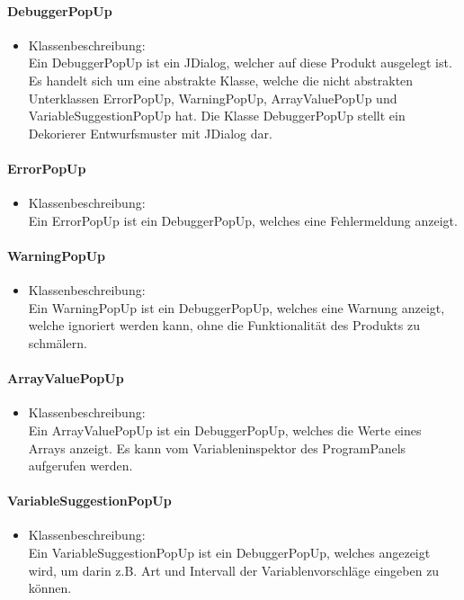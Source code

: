 \documentclass[parskip=full]{scrartcl}
\begin{document}
\paragraph{DebuggerPopUp}
\begin{itemize}
\item Klassenbeschreibung: \\
Ein DebuggerPopUp ist ein JDialog, welcher auf diese Produkt ausgelegt ist. Es handelt sich um eine abstrakte Klasse, welche die nicht abstrakten Unterklassen ErrorPopUp, WarningPopUp, ArrayValuePopUp und VariableSuggestionPopUp hat. Die Klasse DebuggerPopUp stellt ein Dekorierer Entwurfsmuster mit JDialog dar.
\end{itemize}

\paragraph{ErrorPopUp}
\begin{itemize}
\item Klassenbeschreibung: \\
Ein ErrorPopUp ist ein DebuggerPopUp, welches eine Fehlermeldung anzeigt.
\end{itemize}

\paragraph{WarningPopUp}
\begin{itemize}
\item Klassenbeschreibung: \\
Ein WarningPopUp ist ein DebuggerPopUp, welches eine Warnung anzeigt, welche ignoriert werden kann, ohne die Funktionalität des Produkts zu schmälern.
\end{itemize}

\paragraph{ArrayValuePopUp}
\begin{itemize}
\item Klassenbeschreibung: \\
Ein ArrayValuePopUp ist ein DebuggerPopUp, welches die Werte eines Arrays anzeigt. Es kann vom Variableninspektor des ProgramPanels aufgerufen werden.
\end{itemize}

\paragraph{VariableSuggestionPopUp}
\begin{itemize}
\item Klassenbeschreibung: \\
Ein VariableSuggestionPopUp ist ein DebuggerPopUp, welches angezeigt wird, um darin z.B. Art und Intervall der Variablenvorschläge eingeben zu können.
\end{itemize}
\end{document}
